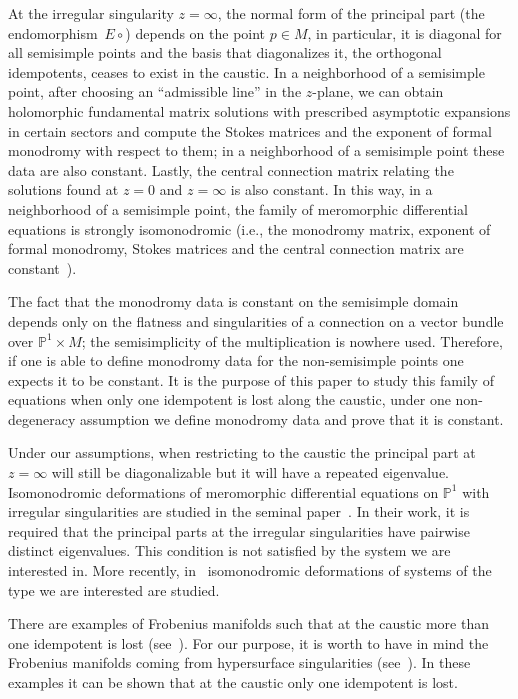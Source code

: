 \documentclass[10pt,a4paper]{amsart}
\numberwithin{equation}{section}
\begin{document}
 At the irregular singularity $z=\infty$, the normal form of the principal part (the endomorphism~$E\circ$) depends on the point $p\in M$, in particular, it is diagonal for all semisimple points and the basis that diagonalizes it, the orthogonal idempotents, ceases to exist in the caustic. In a neighborhood of a semisimple point, after choosing an ``admissible line'' in the $z$-plane, we can obtain holomorphic fundamental matrix solutions with prescribed asymptotic expansions in certain sectors and compute the Stokes matrices and the exponent of formal monodromy with respect to them; in a neighborhood of a semisimple point these data are also constant. Lastly, the central connection matrix relating the solutions found at $z=0$ and $z=\infty$ is also constant. In this way, in a neighborhood of a semisimple point, the family of meromorphic differential equations is strongly isomonodromic (i.e., the monodromy matrix, exponent of formal monodromy, Stokes matrices and the central connection matrix are constant~\cite{Dubrovin:1994hc,Dubrovin:1998fe}).

The fact that the monodromy data is constant on the semisimple domain depends only on the flatness and singularities of a connection on a vector bundle over $\mathbb{P}^{1}\times M$; the semisimplicity of the multiplication is nowhere used. Therefore, if one is able to define monodromy data for the non-semisimple points one expects it to be constant. It is the purpose of this paper to study this family of equations when only one idempotent is lost along the caustic, under one non-degeneracy assumption we define monodromy data and prove that it is constant.

Under our assumptions, when restricting to the caustic the principal part at $z=\infty$ will still be diagonalizable but it will have a repeated eigenvalue. Isomonodromic deformations of meromorphic differential equations on $\mathbb{P}^{1}$ with irregular singularities are studied in the seminal paper~\cite{a0b55245f91244e5bd4b591a56f5a1cb}. In their work, it is required that the principal parts at the irregular singularities have pairwise distinct eigenvalues. This condition is not satisfied by the system we are interested in. More recently, in~\cite{Guzzetti_2022} isomonodromic deformations of systems of the type we are interested are studied.

There are examples of Frobenius manifolds such that at the caustic more than one idempotent is lost (see~\cite{Basalaev_2014}). For our purpose, it is worth to have in mind the Frobenius manifolds coming from hypersurface singularities (see~\cite{1573950398998843136, Saito2008FROMPF}). In these examples it can be shown that at the caustic only one idempotent is lost.
\end{document}
